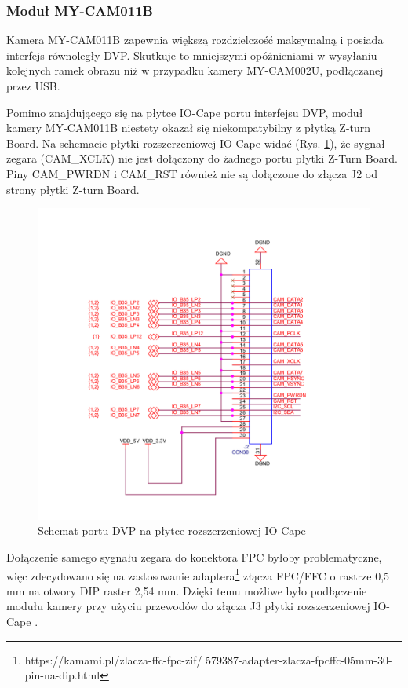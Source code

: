 \subsubsection{Moduł MY-CAM011B}

Kamera MY-CAM011B zapewnia większą rozdzielczość maksymalną i posiada interfejs równoległy DVP. Skutkuje to mniejszymi 
opóźnieniami w wysyłaniu kolejnych ramek obrazu niż w przypadku kamery MY-CAM002U, podłączanej przez USB. 

Pomimo znajdującego się na płytce IO-Cape portu interfejsu DVP, moduł kamery MY-CAM011B niestety okazał się niekompatybilny z 
płytką Z-turn Board. Na schemacie płytki rozszerzeniowej IO-Cape widać (Rys. \ref{cam-schematic}), że sygnał zegara 
(CAM\_XCLK) nie jest dołączony do żadnego portu płytki Z-Turn Board. Piny CAM\_PWRDN i CAM\_RST również nie są dołączone do 
złącza J2 od strony płytki Z-turn Board. 

\begin{figure}[!h]
  \centering
  \includegraphics[width=\textwidth]{img/cam-schematic.png}
  \caption{Schemat portu DVP na płytce rozszerzeniowej IO-Cape}
  \label{cam-schematic}
\end{figure}

Dołączenie samego sygnału zegara do konektora FPC byłoby problematyczne, więc zdecydowano się na 
zastosowanie adaptera\footnote{https://kamami.pl/zlacza-ffc-fpc-zif/
579387-adapter-zlacza-fpcffc-05mm-30-pin-na-dip.html} złącza FPC/FFC o 
rastrze 0,5 mm na otwory DIP raster 2,54 mm. Dzięki temu możliwe było podłączenie modułu kamery 
przy użyciu przewodów do złącza J3 płytki rozszerzeniowej IO-Cape \cite{ZturnIOCapeSchematic}.


